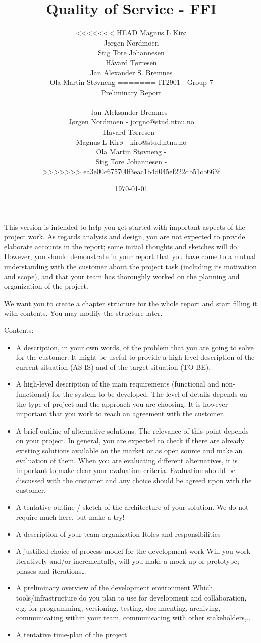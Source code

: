 \documentclass[12pt]{article}
\title{Quality of Service - FFI}
\author{
<<<<<<< HEAD
        Magnus L Kirø \\
        Jørgen Nordmoen \\
        Stig Tore Johannesen \\
        Håvard Tørresen \\
        Jan Alexander S. Bremnes \\
        Ola Martin Støvneng 
=======
        IT2901 - Group 7  \\ 
        Preliminary Report 
        \\ \\
        Jan Aleksander Bremnes - \\
        Jørgen Nordmoen - jorgno@stud.ntnu.no\\
        Håvard Tørresen - \\
        Magnus L Kirø - kiro@stud.ntnu.no\\
        Ola Martin Støvneng - \\
        Stig Tore Johannesen - \\
>>>>>>> ea3e00c675700f3eac1b4d045ef222db51cb663f
}
\date{\today}
\begin{document}
\maketitle
\titlepage
{}

\begin{should contain}
This version is intended to help you get started with important aspects of the project work. As regards analysis and design, you are not expected to provide elaborate accounts in the report; some initial thoughts and sketches will do. However, you should demonstrate in your report that you have come to a mutual understanding with the customer about the project task (including its motivation and scope), and that your team has thoroughly worked on the planning and organization of the project. 

We want you to create a chapter structure for the whole report and start filling it with contents. You may modify the structure later. 

Contents:
\begin{itemize}
\item A description, in your own words, of the problem that you are going to solve for the customer. It might be useful to provide a high-level description of the current situation (AS-IS) and of the target situation (TO-BE).
\item A high-level description of the main requirements (functional and non-functional) for the system to be developed. The level of details depends on the type of project and the approach you are choosing. It is however important that you work to reach an agreement with the customer.
\item A brief outline of alternative solutions. The relevance of this point depends on your project. In general, you are expected to check if there are already existing solutions available on the market or as open source and make an evaluation of them. When you are evaluating different alternatives, it is important to make clear your evaluation criteria. Evaluation should be discussed with the customer and any choice should be agreed upon with the customer.
\item A tentative outline / sketch of the architecture of your solution. 
We do not require much here, but make a try!  
\item A description of your team organization
Roles and responsibilities
\item A justified choice of process model for the development work 
Will you work iteratively and/or incrementally, will you make a mock-up or prototype; phases and iterations…
\item A preliminary overview of the development environment 
Which tools/infrastructure do you plan to use for development and collaboration, e.g. for programming, versioning, testing, documenting, archiving, communicating within your team, communicating with other stakeholders,..
\item A tentative time-plan of the project
\end{itemize}
\end{should contain}
\end{document}
